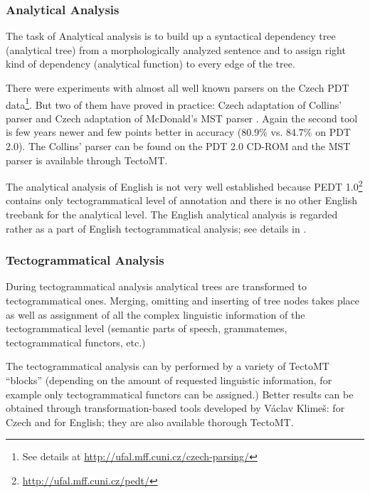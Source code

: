 \subsubsection{Analytical Analysis}

The task of Analytical analysis is to build up a syntactical dependency tree (analytical tree) from a morphologically analyzed sentence and to assign right kind of dependency (analytical function) to every edge of the tree.


There were experiments with almost all well known parsers on the Czech PDT data\footnote{See details at \url{http://ufal.mff.cuni.cz/czech-parsing/}}. But two of them have proved in practice: Czech adaptation of Collins' parser \citep{biblio:collinshbrt_1999} and Czech adaptation of McDonald's MST parser \citep{Novak:2007:FEM:1776334.1776350}. Again the second tool is few years newer and few points better in accuracy (80.9\% vs. 84.7\% on PDT 2.0\footnotemark[\value{footnote}]). The Collins' parser can be found on the PDT 2.0 CD-ROM and the MST parser is available through TectoMT.

The analytical analysis of English is not very well established because PEDT 1.0\footnote{\url{http://ufal.mff.cuni.cz/pedt/}} contains only tectogrammatical level of annotation and there is no other English treebank for the analytical level. The English analytical analysis is regarded rather as a part of English tectogrammatical analysis; see details in \citep{Klimes:2007:TTD:1776334.1776341}.



	
\subsubsection{Tectogrammatical Analysis}

During tectogrammatical analysis analytical trees are transformed to tectogrammatical ones. Merging, omitting and inserting of tree nodes takes place as well as assignment of all the complex linguistic information of the tectogrammatical level (semantic parts of speech, grammatemes, tectogrammatical functors, etc.)

The tectogrammatical analysis can by performed by a variety of TectoMT ``blocks'' (depending on the amount of requested linguistic information, for example only tectogrammatical functors can be assigned.) Better results can be obtained through transformation-based tools developed by Václav Klimeš: \citep{biblio:KlTransformationBasedTectogrammatical2006} for Czech and \citep{Klimes:2007:TTD:1776334.1776341} for English; they are also available thorough TectoMT.


